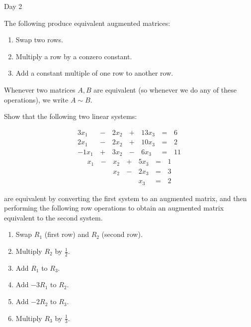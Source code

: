 
\begin{applicationActivities}{Day 2}

\begin{definition}
  The following  produce equivalent
  augmented matrices:
  \begin{enumerate}
    \item Swap two rows.
    \item Multiply a row by a conzero constant.
    \item Add a constant multiple of one row to another row.
  \end{enumerate}
  Whenever two matrices \(A,B\) are equivalent (so whenever we do any of
  these operations), we write \(A\sim B\).
\end{definition}

\begin{activity}{15} %
  Show that the following two linear systems:
  \begin{multicols}{2}\noindent
    \begin{alignat*}{4}
      3x_1 &\,-\,& 2x_2 &\,+\,& 13x_3 &\,=\,& 6 \\
      2x_1 &\,-\,& 2x_2 &\,+\,& 10x_3 &\,=\,& 2 \\
     -1x_1 &\,+\,& 3x_2 &\,-\,&  6x_3 &\,=\,& 11
    \end{alignat*}
    \begin{alignat*}{4}
       x_1 &\,-\,&  x_2  &\,+\,&  5x_3 &\,=\,& 1 \\
           &\, \,&  x_2 &\,-\,&  2x_3 &\,=\,& 3 \\
           &\, \,&      &\, \,&   x_3 &\,=\,& 2
    \end{alignat*}
  \end{multicols}
  are equivalent by converting the first system to an augmented matrix,
  and then performing the following row operations to obtain
  an augmented matrix equivalent to the second system.
  \begin{multicols}{2}\noindent
  \begin{enumerate}
    \item Swap \(R_1\) (first row) and \(R_2\) (second row).
    \item Multiply \(R_2\) by \(\frac{1}{2}\).
    \item Add \(R_1\) to \(R_3\).
    \item Add \(-3R_1\) to \(R_2\).
    \item Add \(-2R_2\) to \(R_3\).
    \item Multiply \(R_3\) by \(\frac{1}{3}\).
  \end{enumerate}
  \end{multicols}
\end{activity}


\end{applicationActivities}
